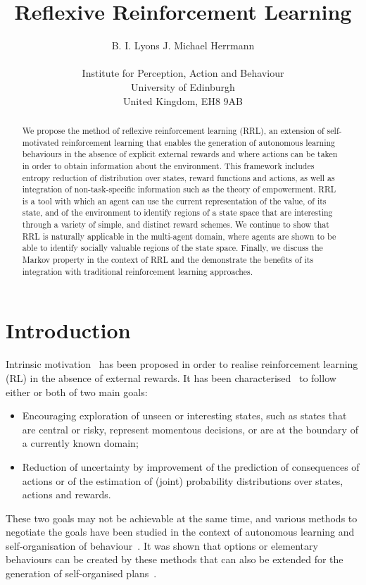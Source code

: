 \documentclass{article}
\title{Reflexive Reinforcement Learning}
\author{
  B. I. Lyons \quad J. Michael Herrmann \\
  \\
  Institute for Perception, Action and Behaviour\\
  University of Edinburgh\\
  United Kingdom, EH8 9AB \\
}
\begin{document}
\maketitle

\begin{abstract}
We propose the method of reflexive reinforcement learning (RRL), an extension of self-motivated reinforcement learning that enables the generation of autonomous learning behaviours in the absence of explicit external rewards and where actions can be taken in order to obtain information about the environment. This framework includes entropy reduction of distribution over states, reward functions and actions, as well as integration of non-task-specific information such as the theory of empowerment. RRL is a tool with which an agent can use the current representation of the value, of its state, and of the environment to identify regions of a state space that are interesting through a variety of simple, and distinct reward schemes. We continue to show that RRL is naturally applicable in the multi-agent domain, where agents are shown to be able to identify socially valuable regions of the state space.%
%
Finally, we discuss the Markov property in the context of RRL and the demonstrate the benefits of its integration with traditional reinforcement learning approaches.
\end{abstract}

\section{Introduction}

Intrinsic motivation~\cite{chentanez2005intrinsically} has been proposed in order to realise 
reinforcement learning (RL) in the absence of external rewards. It has been 
characterised~\cite{pathak2017curiosity} to follow either or both of two main goals:
\begin{itemize}
	\item Encouraging exploration of unseen or interesting states, such as states that
		are central or risky, represent momentous decisions, or are at the 
		boundary of a currently known domain;
	\item Reduction of uncertainty by improvement of the prediction of consequences of 
		actions or of the estimation of (joint) probability distributions over
		states, actions and rewards.
\end{itemize}
These two goals may not be achievable at the same time, and various methods to negotiate the
goals have been studied in the context of autonomous learning and self-organisation 
of behaviour~\cite{bialek1999predictive,der2012playful,klyubin2005empowerment}.
It was shown that options or elementary behaviours can be created by these methods that can 
also be extended for the generation of self-organised plans~\cite{blaes2019control}. 
\end{document}
